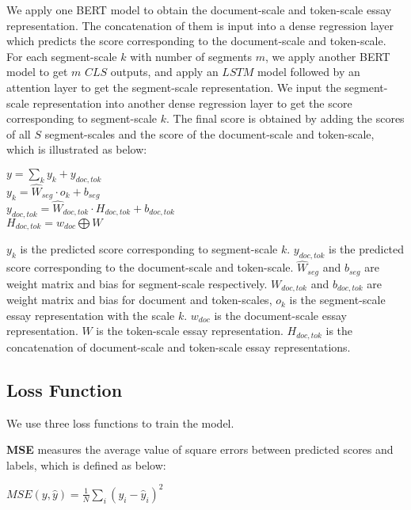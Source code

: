 \documentclass[11pt]{article}
\begin{document}
We apply one BERT model to obtain the document-scale and token-scale essay representation.
The concatenation of them is input into a dense regression layer which predicts the score corresponding to the document-scale and token-scale.
For each segment-scale $k$ with number of segments $m$, we apply another BERT model to get $m$ $CLS$ outputs, and apply an $LSTM$ model followed by an attention layer to get the segment-scale representation.
We input the segment-scale representation into another dense regression layer to get the score corresponding to segment-scale $k$.
The final score is obtained by adding the scores of all $S$ segment-scales and the score of the document-scale and token-scale, which is illustrated as below:




\begin{center}
\label{eq:pred_score}
$ y= \sum_{k} y_k + y_{doc, tok} $  \\
\label{eq:pred_score_seg}
$ y_{k} = \hat W_{seg} \cdot o_k + b_{seg} $ \\
\label{eq:pred_score_doc_tok}
$ y_{doc, tok} = \hat W_{doc, tok} \cdot H_{doc, tok} + b_{doc, tok}$ \\
\label{eq:pred_score_doc_tok}
$ H_{doc, tok}= w_{doc} \bigoplus W $\\
\end{center}


$y_k $ is the predicted score corresponding to segment-scale $k$.
$y_{doc, tok}$ is the predicted score corresponding to the document-scale and token-scale.
$\hat W_{seg}$ and $b_{seg}$ are weight matrix and bias for segment-scale respectively.
$W_{doc, tok}$ and $b_{doc, tok}$ are weight matrix and bias for document and token-scales, $o_k$ is the segment-scale essay representation with the scale $k$.
$w_{doc}$ is the document-scale essay representation.
$W$ is the token-scale essay representation.
$H_{doc, tok}$ is the concatenation of document-scale and token-scale essay representations.

\subsection{Loss Function}
We use three loss functions to train the model. 

\textbf{MSE} measures the average value of square errors between predicted scores and labels, which is defined as below:

\begin{center}
\label{eq:mse}
$MSE(y, \hat y)=\frac{1}{N} \sum_{i} (y_i-\hat y_i)^2$
\end{center}
\end{document}
